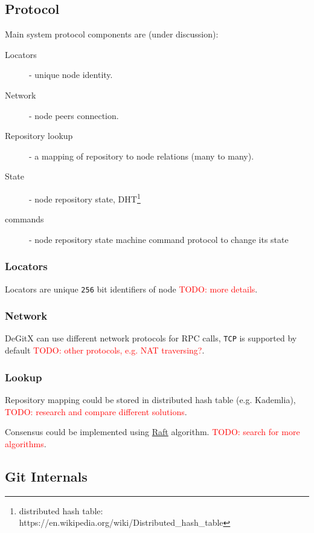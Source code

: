 \documentclass[12pt,oneside]{article}
\newcommand{\code}[1]{\texttt{#1}}
\newcommand{\todo}[1]{\textcolor{red}{TODO: #1}}
\begin{document}
\subsection{Protocol}
Main system protocol components are (under discussion):
\begin{description}
  \item[Locators] - unique node identity.
  \item[Network] - node peers connection.
  \item[Repository lookup] - a mapping of repository to node relations (many to many).
  \item[State] - node repository state,
    DHT\footnote{distributed hash table: https://en.wikipedia.org/wiki/Distributed\_hash\_table}
  \item[commands] - node repository state machine command protocol to change its state
\end{description}

\subsubsection{Locators}
Locators are unique \code{256} bit identifiers of node \todo{more details}.

\subsubsection{Network}
DeGitX can use different network protocols for RPC calls, \code{TCP} is supported by default
\todo{other protocols, e.g. NAT traversing?}.

\subsubsection{Lookup}
Repository mapping could be stored in distributed hash table (e.g. Kademlia),
\todo{research and compare different solutions}.

Consensus could be implemented using \href{https://raft.github.io/raft.pdf}{Raft} algorithm.
\todo{search for more algorithms}.

\subsection{Git Internals}
\end{document}

